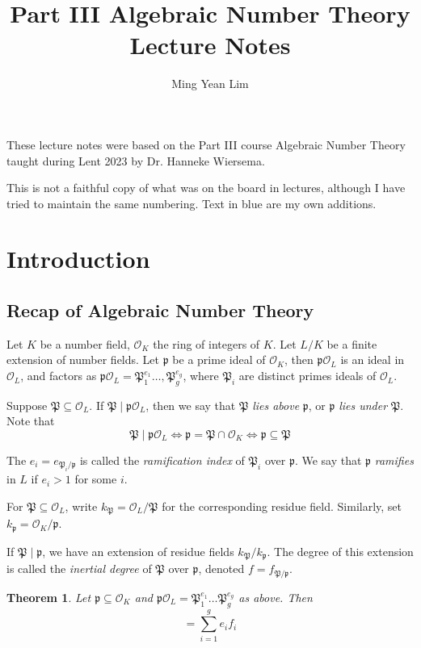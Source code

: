 \documentclass[11pt]{article}
\title{Part III Algebraic Number Theory Lecture Notes}
\author{Ming Yean Lim}
\theoremstyle{definition}
\theoremstyle{plain}
\newtheorem{theorem}[definition]{Theorem}
\theoremstyle{remark}
\newcommand{\cO}{\mathcal{O}}
\newcommand{\cp}{\mathfrak{P}}
\newcommand{\fp}{\mathfrak{p}}
\begin{document}
\maketitle

\noindent These lecture notes were based on the Part III course Algebraic Number Theory taught during Lent 2023 by Dr. Hanneke Wiersema.

This is not a faithful copy of what was on the board in lectures, although I have tried to maintain the same numbering. {\color{blue} Text in blue are my own additions.}

\tableofcontents

\newcommand{\sectionbreak}{\clearpage}

\section{Introduction} %

\subsection{Recap of Algebraic Number Theory}

Let $K$ be a number field, $\cO_K$ the ring of integers of $K$. Let $L/K$ be a finite extension of number fields. Let $\fp$ be a prime ideal of $\cO_K$, then $\fp \cO_L$ is an ideal in $\cO_L$, and factors as $\fp \cO_L = \cp_1^{e_1} \ldots, \cp_g^{e_g}$, where $\cp_i$ are distinct primes ideals of $\cO_L$.

Suppose $\cp \subseteq \cO_L$. If $\cp \mid \fp \cO_L$, then we say that $\cp$ \emph{lies above} $\fp$, or $\fp$ \emph{lies under} $\cp$. Note that
\begin{equation*}
    \cp \mid \fp \cO_L \iff \fp = \cp \cap \cO_K \iff \fp \subseteq \cp
\end{equation*}

The $e_i = e_{\cp_i / \fp}$ is called the \emph{ramification index} of $\cp_i$ over $\fp$. We say that $\fp$ \emph{ramifies} in $L$ if $e_i > 1$ for some $i$.

For $\cp \subseteq \cO_L$, write $k_\cp = \cO_L / \cp$ for the corresponding residue field. Similarly, set $k_\fp = \cO_K / \fp$.

If $\cp \mid \fp$, we have an extension of residue fields $k_\cp / k_\fp$. The degree of this extension is called the \emph{inertial degree} of $\cp$ over $\fp$, denoted $f = f_{\cp / \fp}$.

\begin{theorem}\label{thm:1_1}
    Let $\fp \subseteq \cO_K$ and $\fp \cO_L = \cp_1^{e_1} \ldots \cp_g^{e_g}$ as above. Then
    \begin{equation*}
        [L : K] = \sum_{i=1}^g e_i f_i
    \end{equation*}
\end{theorem}
\end{document}
